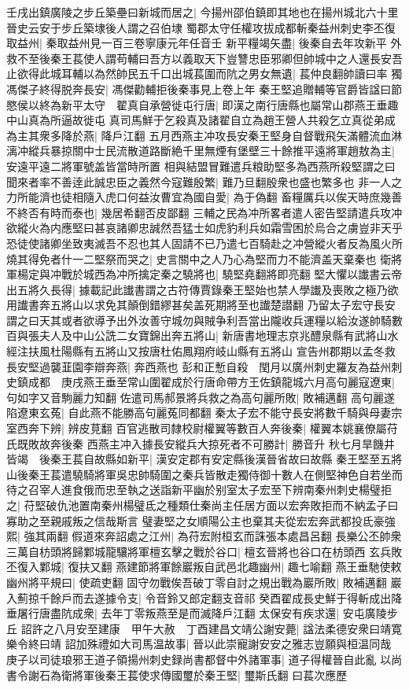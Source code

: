 壬戌出鎮廣陵之步丘築壘曰新城而居之|{
	今揚州邵伯鎮即其地也在揚州城北六十里晉史云安于步丘築埭後人謂之召伯埭}
蜀郡太守任權攻拔成都斬秦益州刺史李丕復取益州|{
	秦取益州見一百三卷寧康元年任音壬}
新平糧竭矢盡|{
	後秦自去年攻新平}
外救不至後秦王萇使人謂苟輔曰吾方以義取天下豈讐忠臣邪卿但帥城中之人還長安吾止欲得此城耳輔以為然帥民五千口出城萇圍而阬之男女無遺|{
	萇仲良翻帥讀曰率}
獨馮傑子終得脱奔長安|{
	馮傑勸輔拒後秦事見上卷上年}
秦王堅追贈輔等官爵皆諡曰節愍侯以終為新平太守　翟真自承營徙屯行唐|{
	即漢之南行唐縣也屬常山郡燕王垂趣中山真為所逼故徙屯}
真司馬鮮于乞殺真及諸翟自立為趙王營人共殺乞立真從弟成為主其衆多降於燕|{
	降戶江翻}
五月西燕主冲攻長安秦王堅身自督戰飛矢滿體流血淋漓冲縱兵暴掠關中士民流散道路斷絶千里無煙有堡壁三十餘推平遠將軍趙敖為主|{
	安遠平遠二將軍號盖皆當時所置}
相與結盟冒難遣兵粮助堅多為西燕所殺堅謂之曰聞來者率不善逹此誠忠臣之義然今寇難殷繁|{
	難乃旦翻殷衆也盛也繁多也}
非一人之力所能濟也徒相隨入虎口何益汝曹宜為國自愛|{
	為于偽翻}
畜糧厲兵以俟天時庶幾善不終否有時而泰也|{
	幾居希翻否皮鄙翻}
三輔之民為冲所畧者遣人密告堅請遣兵攻冲欲縱火為内應堅曰甚哀諸卿忠誠然吾猛士如虎豹利兵如霜雪困於烏合之虜豈非天乎恐徒使諸卿坐致夷滅吾不忍也其人固請不已乃遣七百騎赴之冲營縱火者反為風火所燒其得免者什一二堅祭而哭之|{
	史言關中之人乃心為堅而力不能濟盖天棄秦也}
衛將軍楊定與冲戰於城西為冲所擒定秦之驍將也|{
	驍堅堯翻將即亮翻}
堅大懼以䜟書云帝出五將久長得|{
	據載記此䜟書謂之古符傳賈錄秦王堅始也禁人學䜟及喪敗之極乃欲用䜟書奔五將山以求免其顛倒錯繆甚矣盖死期將至也䜟楚譛翻}
乃留太子宏守長安謂之曰天其或者欲導予出外汝善守城勿與賊争利吾當出隴收兵運糧以給汝遂帥騎數百與張夫人及中山公詵二女寶錦出奔五將山|{
	新唐書地理志京兆醴泉縣有武將山水經注扶風杜陽縣有五將山又按唐杜佑鳳翔府岐山縣有五將山}
宣告州郡期以孟冬救長安堅過襲韮園李辯奔燕|{
	奔西燕也}
彭和正慙自殺　閏月以廣州刺史羅友為益州刺史鎮成都　庚戌燕王垂至常山圍翟成於行唐命帶方王佐鎮龍城六月高句麗寇遼東|{
	句如字又音駒麗力知翻}
佐遣司馬郝景將兵救之為高句麗所敗|{
	敗補邁翻}
高句麗遂陷遼東玄菟|{
	自此燕不能勝高句麗菟同都翻}
秦太子宏不能守長安將數千騎與母妻宗室西奔下辨|{
	辨皮莧翻}
百官逃散司隸校尉權翼等數百人奔後秦|{
	權翼本姚襄僚屬苻氏既敗故奔後秦}
西燕主冲入據長安縱兵大掠死者不可勝計|{
	勝音升}
秋七月旱饑井皆竭　後秦王萇自故縣如新平|{
	漢安定郡有安定縣後漢晉省故曰故縣}
秦王堅至五將山後秦王萇遣驍騎將軍吳忠帥騎圍之秦兵皆散走獨侍御十數人在側堅神色自若坐而待之召宰人進食俄而忠至執之送詣新平幽於别室太子宏至下辨南秦州刺史楊璧拒之|{
	苻堅破仇池置南秦州楊璧氐之種類仕秦尚主任居方面以宏奔敗拒而不納孟子曰寡助之至親戚叛之信哉斯言}
璧妻堅之女順陽公主也棄其夫從宏宏奔武都投氐豪強熙|{
	強其兩翻}
假道來奔詔處之江州|{
	為苻宏附桓玄而誅張本處昌呂翻}
長樂公丕帥衆三萬自枋頭將歸鄴城龍驤將軍檀玄擊之戰於谷口|{
	檀玄晉將也谷口在枋頭西}
玄兵敗丕復入鄴城|{
	復扶又翻}
燕建節將軍餘巖叛自武邑北趣幽州|{
	趣七喻翻}
燕王垂馳使敕幽州將平規曰|{
	使疏吏翻}
固守勿戰俟吾破丁零自討之規出戰為巖所敗|{
	敗補邁翻}
巖入薊掠千餘戶而去遂據令支|{
	令音鈴又郎定翻支音祁}
癸酉翟成長史鮮于得斬成出降垂屠行唐盡阬成衆|{
	去年丁零叛燕至是而滅降戶江翻}
太保安有疾求還|{
	安屯廣陵步丘}
詔許之八月安至建康　甲午大赦　丁酉建昌文靖公謝安薨|{
	諡法柔德安衆曰靖寛樂令終曰靖}
詔加殊禮如大司馬温故事|{
	晉以此崇寵謝安安之雅志豈願與桓温同哉}
庚子以司徒琅邪王道子領揚州刺史録尚書都督中外諸軍事|{
	道子得權晉自此亂}
以尚書令謝石為衛將軍後秦王萇使求傳國璽於秦王堅|{
	璽斯氏翻}
曰萇次應歷


